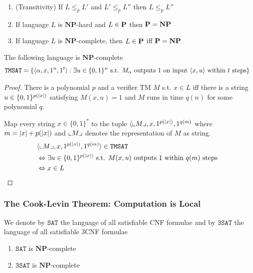 \documentclass[11pt]{article}
\def \NP {\textbf{NP}}
\def \NP {\textbf{NP}}
\def \TMSAT {\texttt{TMSAT}}
\def \SAT {\texttt{SAT}}
\def \TSAT {\texttt{3SAT}}
\begin{document}
\begin{theorem}[]
\begin{enumerate}
\item (Transitivity) If \(L\le_pL'\) and \(L'\le_pL''\) then \(L\le_pL''\)
\item If language \(L\) is \(\NP\)-hard and \(L\in\operatorname{\textbf{P}}\) then \(\bP=\NP\)
\item If language \(L\) is \(\NP\)-complete, then \(L\in\operatorname{\textbf{P}}\) iff \(\bP=\NP\)
\end{enumerate}
\end{theorem}

\begin{theorem}[]
The following language is \(\NP\)-complete
    \begin{equation*}
\TMSAT=\{\la\alpha,x,1^n,1^t\ra:\exists u\in\{0,1\}^n\text{ s.t. }M_\alpha\text{ outputs }1
\text{ on input }\la x,u\ra\text{ within }t\text{ steps}\}
    \end{equation*}
\end{theorem}

\begin{proof}
There is a polynomial \(p\) and a verifier TM \(M\) s.t. \(x\in L\) iff there is a
string \(u\in\{0,1\}^{p(\abs{x})}\) satisfying \(M(x,u)=1\) and \(M\) runs in time \(q(n)\) for
some polynomial \(q\).

Map every string \(x\in\{0,1\}^*\) to the tuple \(\la\lcorner{M},x,1^{p(\abs{x})},1^{q(m)}\)
where \(m=\abs{x}+p(\abs{x})\) and \(\llcorner M \lrcorner\) denotes the representation of \(M\) as
string.
    \begin{align*}
&\la\lcorner{M},x,1^{p(\abs{x})},1^{q(m)}\ra\in\TMSAT\\
&\Leftrightarrow\exists u\in\{0,1\}^{p(\abs{x})}\text{ s.t. }M(x,u)\text{ outputs 1 within }q(m)\text{ steps}\\
&\Leftrightarrow x\in L
    \end{align*}
\end{proof}

\subsubsection{The Cook-Levin Theorem: Computation is Local}
\label{sec:orgb1e025d}
We denote by \(\SAT\) the language of all satisfiable CNF formulae and by \(\TSAT\) the
language of all satisfiable 3CNF formulae

\begin{theorem}
\label{thm2.10}
\begin{enumerate}
\item \(\SAT\) is \(\NP\)-complete
\item \(\TSAT\) is \(\NP\)-complete
\end{enumerate}
\end{theorem}
\end{document}
